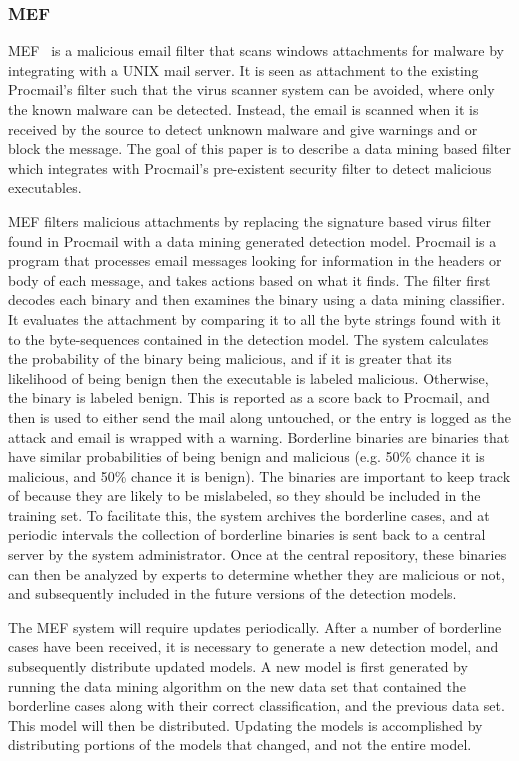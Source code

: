 \documentclass[11pt]{article}
\begin{document}
		\subsubsection{MEF}
		MEF~\cite{schultz2001mef} is a malicious email filter that scans windows attachments for malware by integrating with a UNIX mail server. It is seen as attachment to the existing Procmail’s filter such that the virus scanner system can be avoided, where only the known malware can be detected. Instead, the email is scanned when it is received by the source to detect unknown malware and give warnings and or block the message. 
		The goal of this paper is to describe a data mining based filter which integrates with Procmail’s pre-existent security filter to detect malicious executables.

		MEF filters malicious attachments by replacing the signature based virus filter found in Procmail with a data mining generated detection model. Procmail is a program that processes email messages looking for information in the headers or body of each message, and takes actions based on what it finds. The filter first decodes each binary and then examines the binary using a data mining classifier. It evaluates the attachment by comparing it to all the byte strings found with it to the byte-sequences contained in the detection model. The system calculates the probability of the binary being malicious, and if it is greater that its likelihood of being benign then the executable is labeled malicious. Otherwise, the binary is labeled benign. This is reported as a score back to Procmail, and then is used to either send the mail along untouched, or the entry is logged as the attack and email is wrapped with a warning.
		Borderline binaries are binaries that have similar probabilities of being benign and malicious (e.g. 50\% chance it is malicious, and 50\% chance it is benign). The binaries are important to keep track of because they are likely to be mislabeled, so they should be included in the training set. To facilitate this, the system archives the borderline cases, and at periodic intervals the collection of borderline binaries is sent back to a central server by the system administrator. Once at the central repository, these binaries can then be analyzed by experts to determine whether they are malicious or not, and subsequently included in the future versions of the detection models.

		The MEF system will require updates periodically. After a number of borderline cases have been received, it is necessary to generate a new detection model, and subsequently distribute updated models. A new model is first generated by running the data mining algorithm on the new data set that contained the borderline cases along with their correct classification, and the previous data set. This model will then be distributed. Updating the models is accomplished by distributing portions of the models that changed, and not the entire model.
\end{document}
